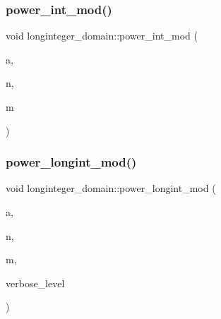 \mbox{\label{classlonginteger__domain_afc796e4ed416f1fe549a1f8379933395}} 
\subsubsection{\texorpdfstring{power\+\_\+int\+\_\+mod()}{power\_int\_mod()}}
{\footnotesize\ttfamily void longinteger\+\_\+domain\+::power\+\_\+int\+\_\+mod (\begin{DoxyParamCaption}\item[{\mbox{\hyperlink{classlonginteger__object}{longinteger\+\_\+object}} \&}]{a,  }\item[{\mbox{\hyperlink{galois_8h_a09fddde158a3a20bd2dcadb609de11dc}{I\+NT}}}]{n,  }\item[{\mbox{\hyperlink{classlonginteger__object}{longinteger\+\_\+object}} \&}]{m }\end{DoxyParamCaption})}

\mbox{\label{classlonginteger__domain_a3ff8c89ead7fa5287d2a7ba1cfea2c1f}} 
\subsubsection{\texorpdfstring{power\+\_\+longint\+\_\+mod()}{power\_longint\_mod()}}
{\footnotesize\ttfamily void longinteger\+\_\+domain\+::power\+\_\+longint\+\_\+mod (\begin{DoxyParamCaption}\item[{\mbox{\hyperlink{classlonginteger__object}{longinteger\+\_\+object}} \&}]{a,  }\item[{\mbox{\hyperlink{classlonginteger__object}{longinteger\+\_\+object}} \&}]{n,  }\item[{\mbox{\hyperlink{classlonginteger__object}{longinteger\+\_\+object}} \&}]{m,  }\item[{\mbox{\hyperlink{galois_8h_a09fddde158a3a20bd2dcadb609de11dc}{I\+NT}}}]{verbose\+\_\+level }\end{DoxyParamCaption})}

